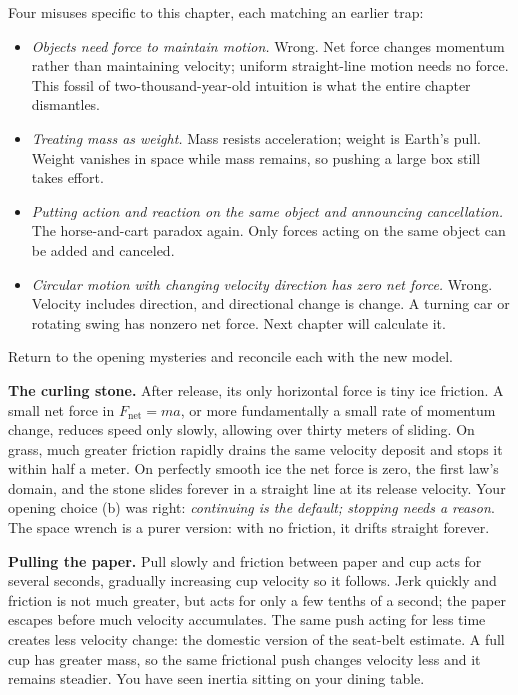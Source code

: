 Four misuses specific to this chapter, each matching an earlier trap:

\begin{itemize}[leftmargin=1.8em]
  \item \emph{Objects need force to maintain motion.} Wrong. Net force changes momentum rather than maintaining velocity; uniform straight-line motion needs no force. This fossil of two-thousand-year-old intuition is what the entire chapter dismantles.
  \item \emph{Treating mass as weight.} Mass resists acceleration; weight is Earth's pull. Weight vanishes in space while mass remains, so pushing a large box still takes effort.
  \item \emph{Putting action and reaction on the same object and announcing cancellation.} The horse-and-cart paradox again. Only forces acting on the same object can be added and canceled.
  \item \emph{Circular motion with changing velocity direction has zero net force.} Wrong. Velocity includes direction, and directional change is change. A turning car or rotating swing has nonzero net force. Next chapter will calculate it.
\end{itemize}


Return to the opening mysteries and reconcile each with the new model.

\textbf{The curling stone.} After release, its only horizontal force is tiny ice friction. A small net force in \(F_{\text{net}}=ma\), or more fundamentally a small rate of momentum change, reduces speed only slowly, allowing over thirty meters of sliding. On grass, much greater friction rapidly drains the same velocity deposit and stops it within half a meter. On perfectly smooth ice the net force is zero, the first law's domain, and the stone slides forever in a straight line at its release velocity. Your opening choice (b) was right: \emph{continuing is the default; stopping needs a reason}. The space wrench is a purer version: with no friction, it drifts straight forever.

\textbf{Pulling the paper.} Pull slowly and friction between paper and cup acts for several seconds, gradually increasing cup velocity so it follows. Jerk quickly and friction is not much greater, but acts for only a few tenths of a second; the paper escapes before much velocity accumulates. The same push acting for less time creates less velocity change: the domestic version of the seat-belt estimate. A full cup has greater mass, so the same frictional push changes velocity less and it remains steadier. You have seen inertia sitting on your dining table.

